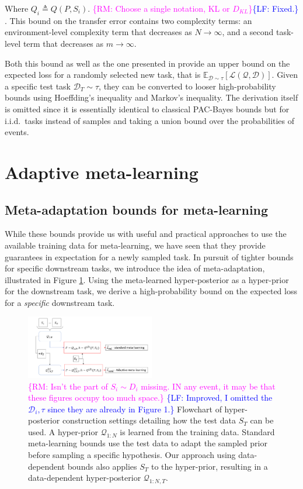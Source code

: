\documentclass[letterpaper]{article} %
\theoremstyle{definition}
\newcommand{\Expect}[2]{\mathbb{E}_{#1}\left [#2 \right ]}
\newcommand{\RM}[1]{\textcolor{magenta}{\{RM: #1\}}}
\newcommand{\LF}[1]{\textcolor{blue}{\{LF: #1\}}}
\begin{document}
Where $Q_i\triangleq Q(P,S_i)$. \RM{Choose a single notation, KL or $D_{KL}$}\LF{Fixed.} . This bound on the transfer error contains two complexity terms: an environment-level complexity term that decreases as $N\rightarrow \infty$, and a second task-level term that decreases as $m\rightarrow \infty$. 

Both this bound as well as the one presented in \cite{Rothfuss2020} provide an upper bound on the expected loss for a randomly selected new task, that is
$\Expect{\mathcal{D}\sim \tau}{\mathcal{L}(\mathcal{Q}, \mathcal{D})}$.
Given a specific test task $\mathcal{D}_T\sim \tau$, they can be converted to looser high-probability bounds using Hoeffding's inequality and Markov's inequality. The derivation itself is omitted since it is essentially identical to classical PAC-Bayes bounds but for i.i.d.\ tasks instead of samples and taking a union bound over the probabilities of events.

\section{Adaptive meta-learning}

\subsection{Meta-adaptation bounds for meta-learning} \label{sec:adapt-general}

While these bounds provide us with useful and practical approaches to use the available training data for meta-learning, we have seen that they provide guarantees in expectation for a newly sampled task. In pursuit of tighter bounds for specific downstream tasks, we introduce the idea of meta-adaptation, illustrated in Figure \ref{fig:data_dependant_bound}. Using the meta-learned hyper-posterior as a hyper-prior for the downstream task, we derive a high-probability bound on the expected loss for a \emph{specific} downstream task. 

\begin{figure}[t]
	\centering
	\includegraphics[width=0.5\textwidth]{data_dependant_adaptation.PNG}
	\caption{\RM{Isn't the part of $S_i\sim D_i$ missing. IN any event, it may be that these figures occupy too much space.} \LF{Improved, I omitted the $\mathcal{D}_i, \tau$ since they are already in Figure 1.} Flowchart of hyper-posterior construction settings detailing how the test data $S_T$ can be used. A hyper-prior $\mathcal{Q}_{1:N}$ is learned from the training data. Standard meta-learning bounds use the test data to adapt the sampled prior before sampling a specific hypothesis. Our approach using data-dependent bounds also applies $S_T$ to the hyper-prior, resulting in a data-dependent hyper-posterior $\mathcal{Q}_{1:N, T}$. }
	\label{fig:data_dependant_bound}
\end{figure}
\end{document}
